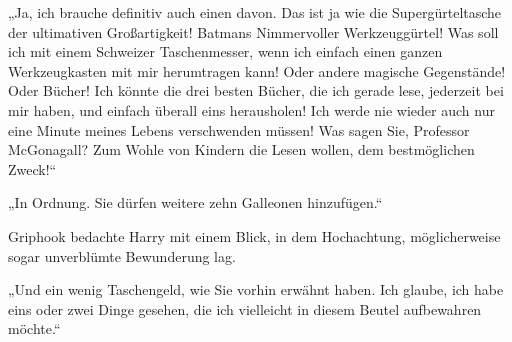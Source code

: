 „Ja, ich brauche definitiv auch einen davon. Das ist ja wie die Supergürteltasche der ultimativen Großartigkeit! Batmans Nimmervoller Werkzeuggürtel! Was soll ich mit einem Schweizer Taschenmesser, wenn ich einfach einen ganzen Werkzeugkasten mit mir herumtragen kann! Oder andere magische Gegenstände! Oder Bücher! Ich könnte die drei besten Bücher, die ich gerade lese, jederzeit bei mir haben, und einfach überall eins herausholen! Ich werde nie wieder auch nur eine Minute meines Lebens verschwenden müssen! Was sagen Sie, Professor McGonagall? Zum Wohle von Kindern die Lesen wollen, dem bestmöglichen Zweck!“

„In Ordnung. Sie dürfen weitere zehn Galleonen hinzufügen.“

Griphook bedachte Harry mit einem Blick, in dem Hochachtung, möglicherweise sogar unverblümte Bewunderung lag.

„Und ein wenig Taschengeld, wie Sie vorhin erwähnt haben. Ich glaube, ich habe eins oder zwei Dinge gesehen, die ich vielleicht in diesem Beutel aufbewahren möchte.“

